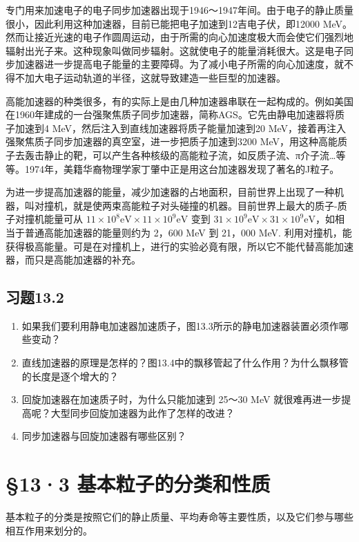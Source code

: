 专门用来加速电子的电子同步加速器出现于1946～1947年间。由于电子的静止质量很小，因此利用这种加速器，目前已能把电子加速到12吉电子伏，即12000
MeV。然而让接近光速的电子作圆周运动，由于所需的向心加速度极大而会使它们强烈地辐射出光子来。这种现象叫做同步辐射。这就使电子的能量消耗很大。这是电子同步加速器进一步提高电子能量的主要障碍。为了减小电子所需的向心加速度，就不得不加大电子运动轨道的半径，这就导致建造一些巨型的加速器。

高能加速器的种类很多，有的实际上是由几种加速器串联在一起构成的。例如美国在1960年建成的一台强聚焦质子同步加速器，简称AGS。它先由静电加速器将质子加速到4
MeV，然后注入到直线加速器将质子能量加速到20
MeV，接着再注入强聚焦质子同步加速器的真空室，进一步把质子加速到3200
MeV，用这种高能质子去轰击静止的靶，可以产生各种核级的高能粒子流，如反质子流、π介子流\ldots 等等。1974年，美籍华裔物理学家丁肇中正是用这台加速器发现了著名的J粒子。

为进一步提高加速器的能量，减少加速器的占地面积，目前世界上出现了一种机器，叫对撞机，就是使两束高能粒子对头碰撞的机器。目前世界上最大的质子-质子对撞机能量可从
\(11 \times 10^{8} \mathrm{eV} \times 11 \times 10^{9} \mathrm{eV}\)
变到
\(31 \times 10^{9} \mathrm{eV} \times 31 \times 10^{9} \mathrm{eV}\)，如相当于普通高能加速器的能量则约为
2，600 MeV 到 21，000 MeV.
利用对撞机，能获得极高能量。可是在对撞机上，进行的实验必竟有限，所以它不能代替高能加速器，而只是高能加速器的补充。

\subsection{习题13.2}

\begin{enumerate}
\item
  如果我们要利用静电加速器加速质子，图13.3所示的静电加速器装置必须作哪些变动？
\item
  直线加速器的原理是怎样的？图13.4中的飘移管起了什么作用？为什么飘移管的长度是逐个增大的？
\item
  回旋加速器在加速质子时，为什么只能加速到 25～30 MeV
  就很难再进一步提高呢？大型同步回旋加速器为此作了怎样的改进？
\item
  同步加速器与回旋加速器有哪些区别？
\end{enumerate}

\section{§13·3
基本粒子的分类和性质}

基本粒子的分类是按照它们的静止质量、平均寿命等主要性质，以及它们参与哪些相互作用来划分的。

